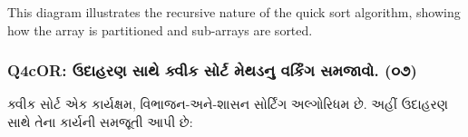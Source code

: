 \begin{Shaded}
\begin{Highlighting}[]
\end{Highlighting}
\end{Shaded}

This diagram illustrates the recursive nature of the quick sort
algorithm, showing how the array is partitioned and sub-arrays are
sorted.

\hypertarget{q4cor-uxa89uxaa6uxab9uxab0uxaa3-uxab8uxaa5-uxa95uxab5uxa95-uxab8uxab0uxa9f-uxaaeuxaa5uxaa1uxaa8-uxab5uxab0uxa95uxa97-uxab8uxaaeuxa9cuxab5.-uxae6uxaed}{%
\subsubsection{Q4cOR: ઉદાહરણ સાથે ક્વીક સોર્ટ મેથડનુ વર્કિંગ સમજાવો.
(૦૭)}\label{q4cor-uxa89uxaa6uxab9uxab0uxaa3-uxab8uxaa5-uxa95uxab5uxa95-uxab8uxab0uxa9f-uxaaeuxaa5uxaa1uxaa8-uxab5uxab0uxa95uxa97-uxab8uxaaeuxa9cuxab5.-uxae6uxaed}}

ક્વીક સોર્ટ એક કાર્યક્ષમ, વિભાજન-અને-શાસન સોર્ટિંગ અલ્ગોરિધમ છે. અહીં ઉદાહરણ સાથે
તેના કાર્યની સમજૂતી આપી છે:

